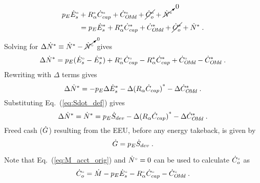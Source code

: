 \begin{landscape}
{\begin{align}
  p_E {}{\dot{E}}^{\scriptscriptstyle \circ}_s &+ {}{R}^{\scriptscriptstyle \circ}_\alpha {}{\dot{C}}^{\scriptscriptstyle \circ}_{cap} + {}{\dot{C}}^{\scriptscriptstyle \circ}_{O\!M\!d} + \cancel{{}{\dot{C}}^{\scriptscriptstyle \circ}_o} + \cancelto{0}{{}{\dot{N}}^{\scriptscriptstyle \circ}} \nonumber \\
                   &= p_E {\dot{E}}^*_s + {R}^*_\alpha {\dot{C}}^*_{cap} + {\dot{C}}^*_{O\!M\!d} + \cancel{{\dot{C}}^*_o}  + {\dot{N}}^* \; .
\end{align}
%
Solving for $\Delta {\dot{N}}^* \equiv {\dot{N}}^* - \cancelto{0}{{}{\dot{N}}^{\scriptscriptstyle \circ}}$ gives 
%
\begin{equation}
  \Delta {\dot{N}}^* = p_E({}{\dot{E}}^{\scriptscriptstyle \circ}_s - {\dot{E}}^*_s) 
                      + {}{R}^{\scriptscriptstyle \circ}_\alpha {}{\dot{C}}^{\scriptscriptstyle \circ}_{cap} - {R}^*_\alpha {\dot{C}}^*_{cap}
                      + {}{\dot{C}}^{\scriptscriptstyle \circ}_{O\!M\!d} - {\dot{C}}^*_{O\!M\!d} \; .
\end{equation}
%
Rewriting with $\Delta$ terms gives
%
\begin{equation}
  \Delta {\dot{N}}^* = - p_E \Delta {\dot{E}}^*_s - \Delta {(R_\alpha \dot{C}_{cap})}^* - \Delta {\dot{C}}^*_{O\!M\!d} \; .
\end{equation}
%
Substituting Eq.~(\ref{eq:Sdot_def}) gives
%
\begin{equation} \label{eq:N_dot_star_empl}
  \Delta {\dot{N}}^* = {\dot{N}}^* = p_E \dot{S}_{dev} - \Delta {(R_\alpha \dot{C}_{cap})}^* - \Delta {\dot{C}}^*_{O\!M\!d} \; .
\end{equation}
%
Freed cash ($\dot{G}$) resulting from the EEU, 
before any energy takeback, is given by 
%
\begin{equation} \label{eq:G_dot}
  \dot{G} = p_E \dot{S}_{dev} \; .
\end{equation}

Note that Eq.~(\ref{eq:M_acct_orig}) and ${}{\dot{N}}^{\scriptscriptstyle \circ} = 0$ can be used to calculate ${}{\dot{C}}^{\scriptscriptstyle \circ}_o$ as
%
\begin{equation} \label{eq:C_dot_o}
  {}{\dot{C}}^{\scriptscriptstyle \circ}_o = \dot{M} - p_E {}{\dot{E}}^{\scriptscriptstyle \circ}_s - {}{R}^{\scriptscriptstyle \circ}_\alpha {}{\dot{C}}^{\scriptscriptstyle \circ}_{cap} - {}{\dot{C}}^{\scriptscriptstyle \circ}_{O\!M\!d} \; .
\end{equation}
%

}
\end{landscape}
